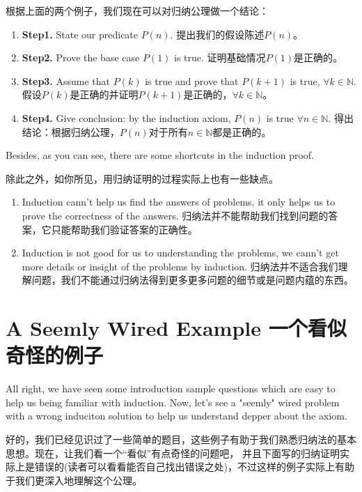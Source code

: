 \documentclass{Math_Note}
\begin{document}
根据上面的两个例子，我们现在可以对归纳公理做一个结论：

\begin{enumerate}
    \item \textbf{Step1.} State our predicate $P(n)$. 提出我们的假设陈述$P(n)$。
    \item \textbf{Step2.} Prove the base case $P(1)$ is true. 证明基础情况$P(1)$是正确的。
    \item \textbf{Step3.} Assume that $P(k)$ is true and prove that $P(k+1)$ is true, $\forall k \in \mathbb{N}$. 假设$P(k)$是正确的并证明$P(k+1)$是正确的，$\forall k \in \mathbb{N}$。
    \item \textbf{Step4.} Give conclusion: by the induction axiom, $P(n)$ is true $\forall n \in \mathbb{N}$. 得出结论：根据归纳公理，$P(n)$对于所有$n \in \mathbb{N}$都是正确的。
\end{enumerate}

Besides, as you can see, there are some shortcuts in the induction proof. 

除此之外，如你所见，用归纳证明的过程实际上也有一些缺点。

\begin{enumerate}
    \item Induction cann't help us find the answers of problems, it only helps us to prove the correctness of the answers. 归纳法并不能帮助我们找到问题的答案，它只能帮助我们验证答案的正确性。
    \item Induction is not good for us to understanding the problems, we cann't get more details or insight of the problems by induction. 归纳法并不适合我们理解问题，我们不能通过归纳法得到更多更多问题的细节或是问题内蕴的东西。
\end{enumerate}

\section{A Seemly Wired Example 一个看似奇怪的例子}

All right, we have seen some introduction sample questions which are easy to help us being familiar with induction. Now, let's see a "seemly" 
wired problem with a wrong induciton solution to help us understand depper about the axiom.

好的，我们已经见识过了一些简单的题目，这些例子有助于我们熟悉归纳法的基本思想。现在，让我们看一个“看似”有点奇怪的问题吧，
并且下面写的归纳证明实际上是错误的(读者可以看看能否自己找出错误之处)，不过这样的例子实际上有助于我们更深入地理解这个公理。
\end{document}
